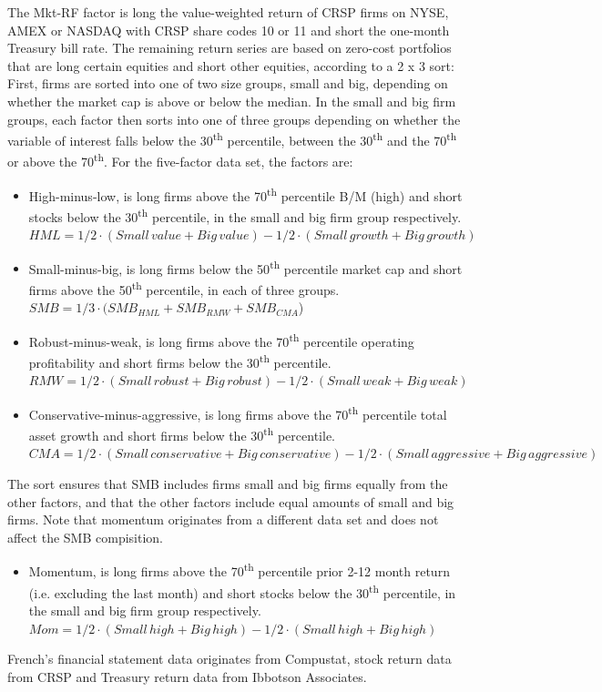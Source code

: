 The Mkt-RF factor is long the value-weighted return of CRSP firms on NYSE, AMEX or NASDAQ with CRSP share codes 10 or 11 and short the one-month Treasury bill rate. The remaining return series are based on zero-cost portfolios that are long certain equities and short other equities, according to a 2 x 3 sort: First, firms are sorted into one of two size groups, small and big, depending on whether the market cap is above or below the median. In the small and big firm groups, each factor then sorts into one of three groups depending on whether the variable of interest falls below the 30\textsuperscript{th} percentile, between the 30\textsuperscript{th} and the 70\textsuperscript{th} or above the 70\textsuperscript{th}. For the five-factor data set, the factors are:
\begin{itemize}
  \item High-minus-low, is long firms above the 70\textsuperscript{th} percentile B/M (high) and short stocks below the 30\textsuperscript{th} percentile, in the small and big firm group respectively. \\
  $HML = 1/2 \cdot (Small\,value + Big\,value) - 1/2 \cdot (Small\,growth + Big\,growth)$
  \item Small-minus-big, is long firms below the 50\textsuperscript{th} percentile market cap and short firms above the 50\textsuperscript{th} percentile, in each of three groups. \\
  $SMB = 1/3 \cdot (SMB_{HML} + SMB_{RMW} + SMB_{CMA}$)
  \item Robust-minus-weak, is long firms above the 70\textsuperscript{th} percentile operating profitability and short firms below the 30\textsuperscript{th} percentile. \\
  $RMW = 1/2 \cdot (Small\,robust + Big\,robust) - 1/2 \cdot (Small\,weak + Big\,weak)$
  \item Conservative-minus-aggressive, is long firms above the 70\textsuperscript{th} percentile total asset growth and short firms below the 30\textsuperscript{th} percentile. \\
  $CMA = 1/2 \cdot (Small\,conservative + Big\,conservative) - 1/2 \cdot (Small\,aggressive + Big\,aggressive)$
\end{itemize}
The sort ensures that SMB includes firms small and big firms equally from the other factors, and that the other factors include equal amounts of small and big firms. Note that momentum originates from a different data set and does not affect the SMB compisition.
\begin{itemize}
  \item Momentum, is long firms above the 70\textsuperscript{th} percentile prior 2-12 month return (i.e. excluding the last month) and short stocks below the 30\textsuperscript{th} percentile, in the small and big firm group respectively. \\
  $Mom = 1/2 \cdot (Small\,high + Big\,high) - 1/2 \cdot (Small\,high + Big\,high)$
\end{itemize}
French's financial statement data originates from Compustat, stock return data from CRSP and Treasury return data from Ibbotson Associates.


